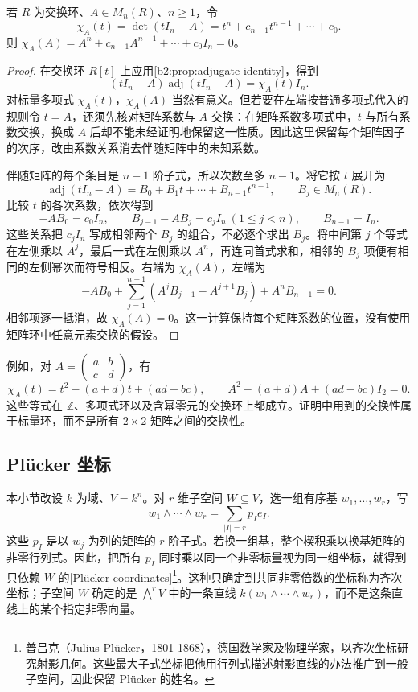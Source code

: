 \begin{theorem}\label{b2:thm:exterior-cayley-hamilton}
	若 \(R\) 为交换环、\(A\in M_n(R)\)、\(n\ge1\)，令
	\[
		\chi_A(t)=\det(tI_n-A)=t^n+c_{n-1}t^{n-1}+\cdots+c_0.
	\]
	则 \(\chi_A(A)=A^n+c_{n-1}A^{n-1}+\cdots+c_0I_n=0\)。
\end{theorem}
\begin{proof}
	在交换环 \(R[t]\) 上应用\cref{b2:prop:adjugate-identity}，得到
	\[
		(tI_n-A)\operatorname{adj}(tI_n-A)=\chi_A(t)I_n.
	\]
	对标量多项式 \(\chi_A(t)\)，\(\chi_A(A)\) 当然有意义。但若要在左端按普通多项式代入的规则令 \(t=A\)，还须先核对矩阵系数与 \(A\) 交换：在矩阵系数多项式中，\(t\) 与所有系数交换，换成 \(A\) 后却不能未经证明地保留这一性质。因此这里保留每个矩阵因子的次序，改由系数关系消去伴随矩阵中的未知系数。

	伴随矩阵的每个条目是 \(n-1\) 阶子式，所以次数至多 \(n-1\)。将它按 \(t\) 展开为
	\[
		\operatorname{adj}(tI_n-A)=B_0+B_1t+\cdots+B_{n-1}t^{n-1}, \qquad B_j\in M_n(R).
	\]
	比较 \(t\) 的各次系数，依次得到
	\[
		-AB_0=c_0I_n,\qquad B_{j-1}-AB_j=c_jI_n\ (1\le j<n),\qquad B_{n-1}=I_n.
	\]
	这些关系把 \(c_jI_n\) 写成相邻两个 \(B_j\) 的组合，不必逐个求出 \(B_j\)。将中间第 \(j\) 个等式在左侧乘以 \(A^j\)，最后一式在左侧乘以 \(A^n\)，再连同首式求和，相邻的 \(B_j\) 项便有相同的左侧幂次而符号相反。右端为 \(\chi_A(A)\)，左端为
	\[
		-AB_0+\sum_{j=1}^{n-1}(A^jB_{j-1}-A^{j+1}B_j) +A^nB_{n-1}=0.
	\]
	相邻项逐一抵消，故 \(\chi_A(A)=0\)。这一计算保持每个矩阵系数的位置，没有使用矩阵环中任意元素交换的假设。
\end{proof}

例如，对 \(A=\begin{pmatrix}a&b\\c&d\end{pmatrix}\)，有
\[
	\chi_A(t)=t^2-(a+d)t+(ad-bc), \qquad A^2-(a+d)A+(ad-bc)I_2=0.
\]
这些等式在 \(\mathbb Z\)、多项式环以及含幂零元的交换环上都成立。证明中用到的交换性属于标量环，而不是所有 \(2\times2\) 矩阵之间的交换性。

\subsection{Plücker 坐标}
\label{b2:subsec:0904:02}

本小节改设 \(k\) 为域、\(V=k^n\)。对 \(r\) 维子空间 \(W\subseteq V\)，选一组有序基 \(w_1,\ldots,w_r\)，写
\[
	w_1\wedge\cdots\wedge w_r=\sum_{|I|=r}p_Ie_I.
\]
这些 \(p_I\) 是以 \(w_j\) 为列的矩阵的 \(r\) 阶子式。若换一组基，整个楔积乘以换基矩阵的非零行列式。因此，把所有 \(p_I\) 同时乘以同一个非零标量视为同一组坐标，就得到只依赖 \(W\) 的[Plücker coordinates]\footnote{普吕克（Julius Plücker，1801-1868），德国数学家及物理学家，以齐次坐标研究射影几何。这些最大子式坐标把他用行列式描述射影直线的办法推广到一般子空间，因此保留 Plücker 的姓名。}。这种只确定到共同非零倍数的坐标称为齐次坐标；子空间 \(W\) 确定的是 \(\bigwedge^rV\) 中的一条直线 \(k(w_1\wedge\cdots\wedge w_r)\)，而不是这条直线上的某个指定非零向量。

